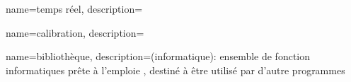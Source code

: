 

{
	name=temps réel,
    description={}
}

{
	name=calibration,
    description={}
}

{
	name=bibliothèque,
    description={(informatique): ensemble de fonction informatiques prête à l'emploie , destiné à être utilisé par d'autre programmes}
}



